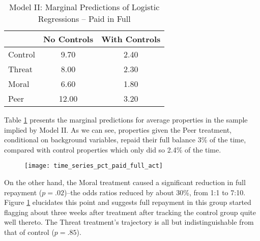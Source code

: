 \documentclass[12pt,titlepage]{article}
\begin{document}
\begin{table}[htbp]
\centering
\begin{tabular}{lcc}
  \hline
 & No Controls & With Controls \\ 
  \hline
Control & 9.70 & 2.40 \\ 
  Threat & 8.00 & 2.30 \\ 
  Moral & 6.60 & 1.80 \\ 
  Peer & 12.00 & 3.20 \\ 
   \hline
\end{tabular}
\caption{Model II: Marginal Predictions of Logistic Regressions -- Paid in Full} 
\label{table:modelII_marg}
\end{table}

Table \ref{table:modelII_marg} presents the marginal predictions for
average properties in the sample implied by Model II. As we can see,
properties given the Peer treatment, conditional on background variables,
repaid their full balance 3\% of the time, compared with control 
properties which only did so 2.4\% of the time.

\begin{figure}[htbp]
\begin{center}
\caption{} \label{paid_full_act}
\texttt{[image: time\_series\_pct\_paid\_full\_act]}
\par\end{center}
\end{figure}

On the other hand, the Moral treatment caused a significant reduction in full
repayment ($p=.02$)--the odds ratios reduced by about 30\%, from 1:1 to 7:10.
Figure \ref{paid_full_act} elucidates this point and suggests full
repayment in this group started flagging about three weeks after
treatment after tracking the control group quite well thereto.
The Threat treatment's trajectory is all but indistinguishable from that of control ($p=.85$).
\end{document}
